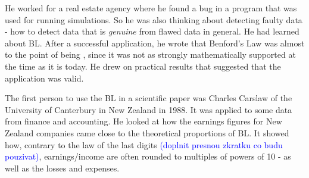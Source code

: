 
He worked for a real estate agency where he found a bug in a program that was used for running simulations. So he was also thinking about detecting faulty data - how to detect data that is \emph{genuine} from flawed data in general. He had learned about BL. After a successful application, he wrote that Benford's Law was almost to the point of being \emph{}, since it was not as strongly mathematically supported at the time as it is today. He drew on practical results that suggested that the application was valid. \cite{kossovsky2014benford} %





The first person to use the BL in a scientific paper was Charles Carslaw of the University of Canterbury in New Zealand in 1988. It was applied to some data from finance and accounting. He looked at how the earnings figures for New Zealand companies came close to the theoretical proportions of BL. It showed how, contrary to the law of the last digits \textcolor{blue}{(doplnit presnou zkratku co budu pouzivat)}, earnings/income are often rounded to multiples of powers of 10 - as well as the losses and expenses. \cite{kossovsky2014benford} %

